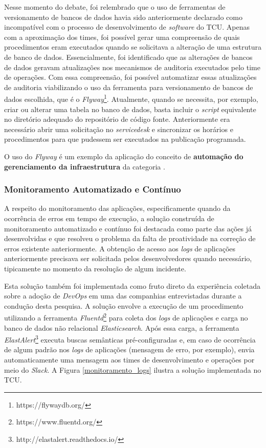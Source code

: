 Nesse momento do debate, foi relembrado que o uso de ferramentas de versionamento de bancos de dados
havia sido anteriormente declarado como incompatível com o processo de
desenvolvimento de {\it software} do \acrshort{TCU}. Apenas com a aproximação
dos times, foi possível gerar uma compreensão de quais procedimentos eram
executados quando se solicitava a alteração de uma estrutura de banco de dados.
Essencialmente, foi identificado que as alterações de bancos de dados geravam
atualizações nos mecanismos de auditoria executados pelo time de operações. Com
essa compreensão, foi possível automatizar essas atualizações de auditoria viabilizando o uso
da ferramenta para versionamento de bancos de dados escolhida, que é o {\it Flyway}\footnote{https://flywaydb.org/}.
Atualmente, quando se necessita, por exemplo, criar ou alterar uma tabela no
banco de dados, basta incluir o {\it script} equivalente no diretório adequado
do repositório
de código fonte. Anteriormente era necessário abrir uma solicitação no {\it servicedesk}
e sincronizar os horários e procedimentos para que pudessem ser executados na
publicação programada.

O uso do {\it Flyway} é um exemplo da aplicação do conceito de {\bf automação do
gerenciamento da infraestrutura} da categoria .

\subsubsection{Monitoramento Automatizado e Contínuo}

A respeito do monitoramento das aplicações, especificamente quando da ocorrência
de erros em tempo de execução, a solução construída de
monitoramento automatizado e contínuo foi destacada como parte das ações já
desenvolvidas e que resolveu o problema da falta de proatividade na correção de
erros existente anteriormente. A obtenção de acesso aos {\it logs} de aplicações
anteriormente precisava ser solicitada pelos desenvolvedores quando necessário,
tipicamente no momento da resolução de algum incidente.

Esta solução também foi implementada como fruto direto da experiência
coletada sobre a adoção de {\it DevOps} em uma das companhias entrevistadas
durante a condução desta pesquisa. A solução envolve a execução de um
procedimento utilizando a ferramenta {\it Fluentd}\footnote{https://www.fluentd.org/}
para coleta dos {\it logs} de aplicações e carga no banco de dados não
relacional {\it Elasticsearch}. Após essa carga, a ferramenta {\it ElastAlert}\footnote{http://elastalert.readthedocs.io/}
executa buscas semânticas pré-configuradas e, em caso de ocorrência de algum
padrão nos {\it logs} de aplicações (mensagem de erro, por exemplo), envia
automaticamente uma mensagem aos times de desenvolvimento e operações por meio
do {\it Slack}. A Figura \ref{monitoramento_logs} ilustra a solução
implementada no \acrshort{TCU}.

